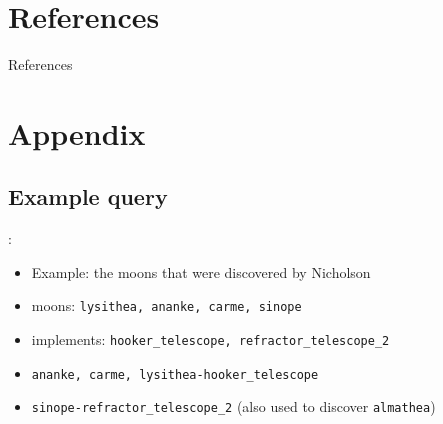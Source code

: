 \documentclass[logoontitle,tabu,supertabular,aspectratio=43]{preney-uwindsor-beamer}
\begin{document}


    \section{References}
	\begin{frame}[allowframebreaks]{References}
	\printbibliography
	\end{frame}

    \section{Appendix}
    \subsection{Example query}
    \begin{frame}{\insertsection: \insertsubsection}
        \begin{itemize}

            \item Example: the moons that were discovered by Nicholson
            \item moons: \texttt{lysithea, ananke, carme, sinope}
            \item implements: \texttt{hooker\_telescope, refractor\_telescope\_2}
            \item \texttt{ananke, carme, lysithea-hooker\_telescope}
            \item \texttt{sinope-refractor\_telescope\_2} (also used to discover \texttt{almathea})
        \end{itemize}
    \end{frame}
\end{document}
